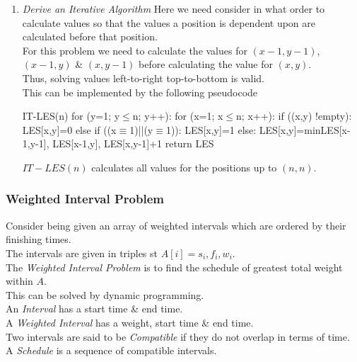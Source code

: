 \documentclass[11pt,a4paper]{article}
\begin{document}
\begin{enumerate}[label=\roman*)]
\item \textit{Derive an Iterative Algorithm}
Here we need consider in what order to calculate values so that the values a position is dependent upon are calculated before that position.\\
For this problem we need to calculate the values for $(x-1,y-1)$, $(x-1,y)$ \& $(x,y-1)$ before calculating the value for $(x,y)$.\\
Thus, solving values left-to-right top-to-bottom is valid.\\
This can be implemented by the following pseudocode
\begin{code}
IT-LES(n)
for (y=1; y$\leq$n; y++):
  for (x=1; x$\leq$n; x++):
    if ((x,y) !empty):
      LES[x,y]=0
    else if ((x$\equiv$1)||(y$\equiv$1)):
      LES[x,y]=1
    else:
      LES[x,y]=min{LES[x-1,y-1], LES[x-1,y], LES[x,y-1]}+1
return LES
\end{code}
\nb $IT-LES(n)$ calculates all values for the positions up to $(n,n)$.
\end{enumerate}

\subsubsection{Weighted Interval Problem}

Consider being given an array of weighted intervals which are ordered by their finishing times.\\
The intervals are given in triples st $A[i]=s_i,f_i,w_i$.\\
The \textit{Weighted Interval Problem} is to find the schedule of greatest total weight within $A$.\\
This can be solved by dynamic programming.\\

An \textit{Interval} has a start time \& end time.\\
A \textit{Weighted Interval} has a weight, start time \& end time.\\

Two intervals are said to be \textit{Compatible} if they do not overlap in terms of time.\\

A \textit{Schedule} is a sequence of compatible intervals.\\
\end{document}

